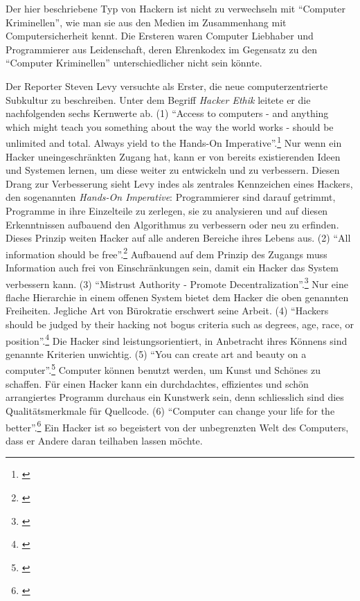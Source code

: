 \documentclass[
paper=164mm:234mm, %
pagesize, %
DIV=calc, %
10pt, %
BCOR=0mm, %
parskip=half- %
]{scrbook}
\begin{document}
Der hier beschriebene Typ von Hackern ist nicht zu verwechseln mit \enquote{Computer Kriminellen}, wie man sie aus den Medien im Zusammenhang mit Computersicherheit kennt. Die Ersteren waren Computer Liebhaber und Programmierer aus Leidenschaft, deren  Ehrenkodex im Gegensatz zu den \enquote{Computer Kriminellen} unterschiedlicher nicht sein könnte.

Der Reporter Steven Levy versuchte als Erster, die neue computerzentrierte Subkultur zu beschreiben. Unter dem Begriff \emph{Hacker Ethik} leitete er die nachfolgenden sechs Kernwerte ab.
(1) \enquote{Access to computers - and anything which might teach you something about the way the world works - should be unlimited and total. Always yield to the Hands-On Imperative}.\footnote{\cite[27]{Levy:1984}} Nur wenn ein Hacker uneingeschränkten Zugang hat, kann er von bereits existierenden Ideen und Systemen lernen, um diese weiter zu entwickeln und zu verbessern. Diesen Drang zur Verbesserung sieht Levy indes als zentrales Kennzeichen eines Hackers, den sogenannten \emph{Hands-On Imperative}: Programmierer sind darauf getrimmt, Programme in ihre Einzelteile zu zerlegen, sie zu analysieren und auf diesen Erkenntnissen aufbauend den Algorithmus zu verbessern oder neu zu erfinden. Dieses Prinzip weiten Hacker auf alle anderen Bereiche ihres Lebens aus.
(2) \enquote{All information should be free}.\footnote{\cite[27]{Levy:1984}} Aufbauend auf dem Prinzip des Zugangs muss Information auch frei von Einschränkungen sein, damit ein Hacker das System verbessern kann.
(3) \enquote{Mistrust Authority - Promote Decentralization}.\footnote{\cite[28]{Levy:1984}} Nur eine flache Hierarchie in einem offenen System bietet dem Hacker die oben genannten Freiheiten. Jegliche Art von Bürokratie erschwert seine Arbeit.
(4) \enquote{Hackers should be judged by their hacking not bogus criteria such as degrees, age, race, or position}.\footnote{\cite[30]{Levy:1984}} Die Hacker sind leistungsorientiert, in Anbetracht ihres Könnens sind genannte Kriterien unwichtig.
(5) \enquote{You can create art and beauty on a computer}.\footnote{\cite[30]{Levy:1984}} Computer können benutzt werden, um Kunst und Schönes zu schaffen. Für einen Hacker kann ein durchdachtes, effizientes und schön arrangiertes Programm durchaus ein Kunstwerk sein, denn schliesslich sind dies Qualitätsmerkmale für Quellcode.
(6) \enquote{Computer can change your life for the better}.\footnote{\cite[33]{Levy:1984}} Ein Hacker ist so begeistert von der unbegrenzten Welt des Computers, dass er Andere daran teilhaben lassen möchte.
\end{document}
